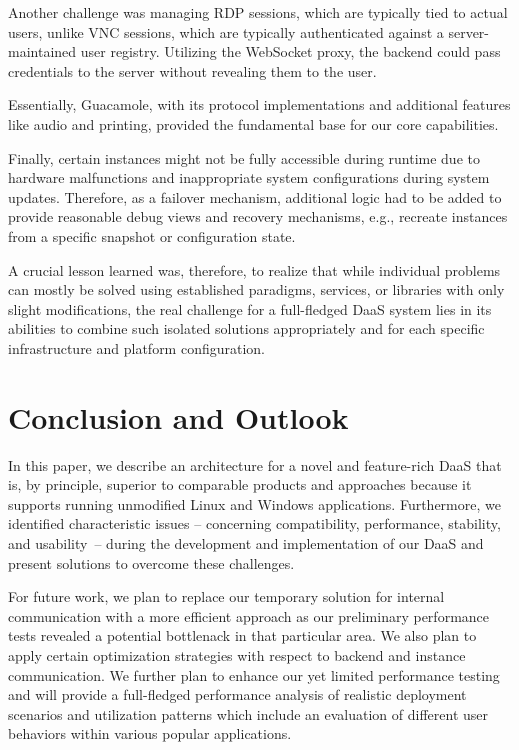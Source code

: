 \documentclass[runningheads]{llncs}
\begin{document}
Another challenge was managing RDP sessions, which are typically tied to actual users,
unlike VNC sessions, which are typically authenticated against
a server-maintained user registry.
Utilizing the WebSocket proxy, the backend could pass credentials
to the server without revealing them to the user.

Essentially, Guacamole, with its protocol implementations and additional features like audio and printing,
provided the fundamental base for our core capabilities.

Finally, certain instances might not be fully accessible during runtime
due to hardware malfunctions and inappropriate system configurations during system updates.
Therefore, as a failover mechanism, additional logic had to be added
to provide reasonable debug views and recovery mechanisms,
e.g., recreate instances from a specific snapshot or configuration state.

A crucial lesson learned was, therefore, to realize that
while individual problems can mostly be solved
using established paradigms, services, or libraries with only slight modifications,
the real challenge for a full-fledged DaaS system lies in its abilities
to combine such isolated solutions appropriately
and for each specific infrastructure and platform configuration.

\section{Conclusion and Outlook}\label{sec:Conclusions}

In this paper, we describe an architecture for a novel
and feature-rich DaaS that is, by principle,
superior to comparable products and approaches
because it supports running unmodified Linux and Windows applications.
Furthermore, we identified characteristic issues
-- concerning compatibility, performance, stability, and usability --
during the development and implementation of our DaaS
and present solutions to overcome these challenges.

For future work,
we plan to replace our temporary solution for internal communication
with a more efficient approach as our preliminary performance tests revealed
a potential bottlenack in that particular area.
We also plan to apply certain optimization strategies
with respect to backend and instance communication.
We further plan to enhance our yet limited performance testing
and will provide a full-fledged performance analysis
of realistic deployment scenarios and utilization patterns
which include an evaluation of different user behaviors
within various popular applications.
\end{document}
